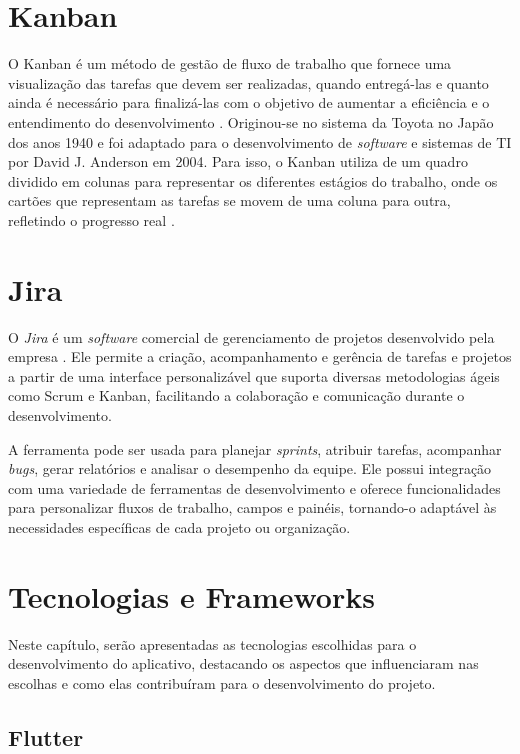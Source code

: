 \section{Kanban}

O Kanban é um método de gestão de fluxo de trabalho que fornece uma visualização 
das tarefas que devem ser realizadas, quando entregá-las e quanto ainda é necessário 
para finalizá-las com o objetivo de aumentar a eficiência e o entendimento do 
desenvolvimento \cite{ohno1988toyota}. Originou-se no sistema da Toyota no Japão 
dos anos 1940 e foi adaptado para o desenvolvimento de \textit{software} e sistemas de 
TI por David J. Anderson em 2004. Para isso, o Kanban utiliza de um quadro dividido em 
colunas para representar os diferentes estágios do trabalho, onde os cartões que 
representam as tarefas se movem de uma coluna para outra, refletindo o progresso real 
\cite{zayat2020framework}.

\section{Jira}

O \textit{Jira} é um \textit{software} comercial de gerenciamento de projetos desenvolvido 
pela empresa . Ele permite a criação, acompanhamento e gerência de tarefas e projetos a partir de uma interface personalizável que suporta diversas metodologias ágeis como Scrum e Kanban, facilitando a colaboração e comunicação durante o desenvolvimento.

A ferramenta pode ser usada para planejar \textit{sprints}, atribuir tarefas, acompanhar 
\textit{bugs}, gerar relatórios e analisar o desempenho da equipe. Ele possui 
integração com uma variedade de ferramentas de desenvolvimento e oferece funcionalidades 
para personalizar fluxos de trabalho, campos e painéis, tornando-o adaptável às 
necessidades específicas de cada projeto ou organização.


\section{Tecnologias e Frameworks}\label{tecnologias}

Neste capítulo, serão apresentadas as tecnologias escolhidas para o 
desenvolvimento do aplicativo, destacando os aspectos que influenciaram nas 
escolhas e como elas contribuíram para o desenvolvimento do projeto.

\subsection{Flutter}


